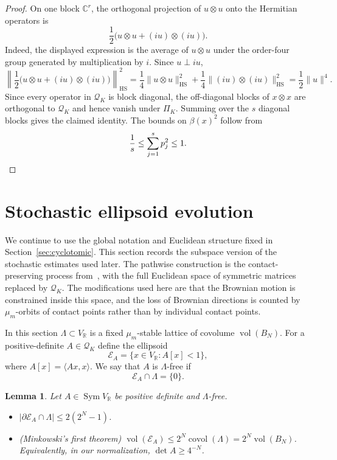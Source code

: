 \documentclass[11pt]{article}
\newtheorem{lemma}[theorem]{Lemma}
\theoremstyle{remark}
\newcommand{\R}{\mathbb R}
\newcommand{\C}{\mathbb C}
\newcommand{\vol}{\operatorname{vol}}
\newcommand{\covol}{\operatorname{covol}}
\newcommand{\Sym}{\operatorname{Sym}}
\newcommand{\HS}{\operatorname{HS}}
\newcommand{\calE}{\mathcal E}
\begin{document}
\begin{proof}
On one block $\C^r$, the orthogonal projection of $u\otimes u$ onto the
Hermitian operators is
\[
        \frac12\bigl(u\otimes u+(iu)\otimes(iu)\bigr).
\]
Indeed, the displayed expression is the average of $u\otimes u$ under the
order-four group generated by multiplication by $i$.  Since $u\perp iu$,
\[
        \left\|\frac12\bigl(u\otimes u+(iu)\otimes(iu)\bigr)\right\|_{\HS}^2
        =\frac14\|u\otimes u\|_{\HS}^2+
         \frac14\|(iu)\otimes(iu)\|_{\HS}^2
        =\frac12\|u\|^4.
\]
Since every operator in $\mathcal Q_K$ is block diagonal, the off-diagonal
blocks of $x\otimes x$ are orthogonal to $\mathcal Q_K$ and hence vanish under
$\Pi_K$.
Summing over the $s$ diagonal blocks gives the claimed identity.  The bounds
on $\beta(x)^2$ follow from
\[
        \frac1s\le\sum_{j=1}^sp_j^2\le1.\qedhere
\]
\end{proof}


\section{Stochastic ellipsoid evolution}

We continue to use the global notation and Euclidean structure fixed in
Section~\ref{sec:cyclotomic}.  This section records
the subspace version of the stochastic estimates used later.  The pathwise
construction is the contact-preserving process from~\cite[Proposition~2.3 and
Corollary~2.4]{Klartag}, with the full Euclidean space of symmetric matrices
replaced by $\mathcal Q_K$.  The modifications used here are that
the Brownian motion is constrained inside this space, and the loss of Brownian
directions is counted by $\mu_m$-orbits of contact points rather than by
individual contact points.

In this section $\Lambda\subset V_\R$ is a fixed $\mu_m$-stable lattice of covolume $\vol(B_N)$.  For a positive-definite $A\in\mathcal Q_K$ define the ellipsoid
\[
        \calE_A=\{x\in V_\R:A[x]<1\},
\]
where $A[x]=\langle Ax,x\rangle$.
We say that $A$ is $\Lambda$-free if
\[
        \calE_A\cap\Lambda=\{0\}.
\]

\begin{lemma}\label{lem:standard-geometric}
Let $A\in\Sym V_\R$ be positive definite and $\Lambda$-free.
\begin{itemize}
\item[(i)] \cite[Appendix~A, Lemma~A.1]{Klartag}
$|\partial\calE_A\cap\Lambda|\le 2(2^N-1)$.
\item[(ii)] (Minkowski's first theorem)
$\vol(\calE_A)\le 2^N\covol(\Lambda)=2^N\vol(B_N)$.
Equivalently, in our normalization, $\det A\ge4^{-N}$.
\end{itemize}
\end{lemma}
\end{document}
